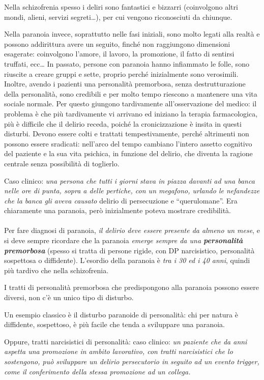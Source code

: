 Nella schizofrenia spesso i deliri sono fantastici e bizzarri
(coinvolgono altri mondi, alieni, servizi segreti\ldots{}), per cui
vengono riconosciuti da chiunque.

Nella paranoia invece, soprattutto nelle fasi iniziali, sono molto
legati alla realtà e possono addirittura avere un seguito, finché non
raggiungono dimensioni esagerate: coinvolgono l'amore, il lavoro, la
promozione, il fatto di sentirsi truffati, ecc\ldots{} In passato,
persone con paranoia hanno infiammato le folle, sono riuscite a creare
gruppi e sette, proprio perché inizialmente sono verosimili. Inoltre,
avendo i pazienti una personalità premorbosa, senza destrutturazione
della personalità, sono credibili e per molto tempo riescono a mantenere
una vita sociale normale. Per questo giungono tardivamente
all'osservazione del medico: il problema è che più tardivamente vi
arrivano ed iniziano la terapia farmacologica, più è difficile che il
delirio receda, poiché la cronicizzazione è insita in questi disturbi.
Devono essere colti e trattati tempestivamente, perché altrimenti non
possono essere sradicati: nell'arco del tempo cambiano l'intero assetto
cognitivo del paziente e la sua vita psichica, in funzione del delirio,
che diventa la ragione centrale senza possibilità di toglierlo.

Caso clinico: \emph{una persona che tutti i giorni stava in piazza
davanti ad una banca nelle ore di punta, sopra a delle pertiche, con un
megafono, urlando le nefandezze che la banca gli aveva causato} delirio
di persecuzione e ``querulomane''. Era chiaramente una paranoia, però
inizialmente poteva mostrare credibilità.
\\\\
Per fare diagnosi di paranoia, \emph{il delirio deve essere presente da
almeno un mese}, e si deve sempre ricordare che la paranoia \emph{emerge
sempre da una \textbf{personalità premorbosa}} (spesso si tratta di
persone rigide, con DP narcisistico, personalità sospettosa o
diffidente). L'esordio della paranoia è \emph{tra i 30 ed i 40 anni},
quindi più tardivo che nella schizofrenia.

I tratti di personalità premorbosa che predispongono alla paranoia
possono essere diversi, non c'è un unico tipo di disturbo.

Un esempio classico è il disturbo paranoide di personalità: chi per
natura è diffidente, sospettoso, è più facile che tenda a sviluppare una
paranoia.

Oppure, tratti narcisistici di personalità: caso clinico: \emph{un
paziente che da anni aspetta una promozione in ambito lavorativo, con
tratti narcisistici che lo sostengono, può sviluppare un delirio
persecutorio in seguito ad un evento trigger, come il conferimento della
stessa promozione ad un collega. }

